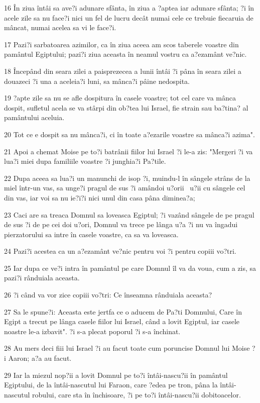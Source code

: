\par 16 În ziua întâi sa ave?i adunare sfânta, în ziua a ?aptea iar adunare sfânta; ?i în acele zile sa nu face?i nici un fel de lucru decât numai cele ce trebuie fiecaruia de mâncat, numai acelea sa vi le face?i.
\par 17 Pazi?i sarbatoarea azimilor, ca în ziua aceea am scos taberele voastre din pamântul Egiptului; pazi?i ziua aceasta în neamul vostru ca a?ezamânt ve?nic.
\par 18 Începând din seara zilei a paisprezecea a lunii întâi ?i pâna în seara zilei a douazeci ?i una a aceleia?i luni, sa mânca?i pâine nedospita.
\par 19 ?apte zile sa nu se afle dospitura în casele voastre; tot cel care va mânca dospit, sufletul acela se va stârpi din ob?tea lui Israel, fie strain sau ba?tina? al pamântului aceluia.
\par 20 Tot ce e dospit sa nu mânca?i, ci în toate a?ezarile voastre sa mânca?i azima".
\par 21 Apoi a chemat Moise pe to?i batrânii fiilor lui Israel ?i le-a zis: "Mergeri ?i va lua?i miei dupa familiile voastre ?i junghia?i Pa?tile.
\par 22 Dupa aceea sa lua?i un manunchi de isop ?i, muindu-l în sângele strâns de la miel într-un vas, sa unge?i pragul de sus ?i amândoi u?orii  u?ii cu sângele cel din vas, iar voi sa nu ie?i?i nici unul din casa pâna diminea?a;
\par 23 Caci are sa treaca Domnul sa loveasca Egiptul; ?i vazând sângele de pe pragul de sus ?i de pe cei doi u?ori, Domnul va trece pe lânga u?a ?i nu va îngadui pierzatorului sa intre în casele voastre, ca sa va loveasca.
\par 24 Pazi?i acestea ca un a?ezamânt ve?nic pentru voi ?i pentru copiii vo?tri.
\par 25 Iar dupa ce ve?i intra în pamântul pe care Domnul îl va da voua, cum a zis, sa pazi?i rânduiala aceasta.
\par 26 ?i când va vor zice copiii vo?tri: Ce înseamna rânduiala aceasta?
\par 27 Sa le spune?i: Aceasta este jertfa ce o aducem de Pa?ti Domnului, Care în Egipt a trecut pe lânga casele fiilor lui Israel, când a lovit Egiptul, iar casele noastre le-a izbavit". ?i s-a plecat poporul ?i s-a închinat.
\par 28 Au mers deci fiii lui Israel ?i au facut toate cum poruncise Domnul lui Moise ?i Aaron; a?a au facut.
\par 29 Iar la miezul nop?ii a lovit Domnul pe to?i întâi-nascu?ii în pamântul Egiptului, de la întâi-nascutul lui Faraon, care ?edea pe tron, pâna la întâi-nascutul robului, care sta în închisoare, ?i pe to?i întâi-nascu?ii dobitoacelor.
